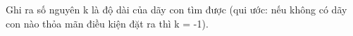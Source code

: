 Ghi ra số nguyên k là độ dài của dãy con tìm được (qui ước: nếu không có dãy con nào thỏa mãn điều kiện đặt ra thì k = -1).
